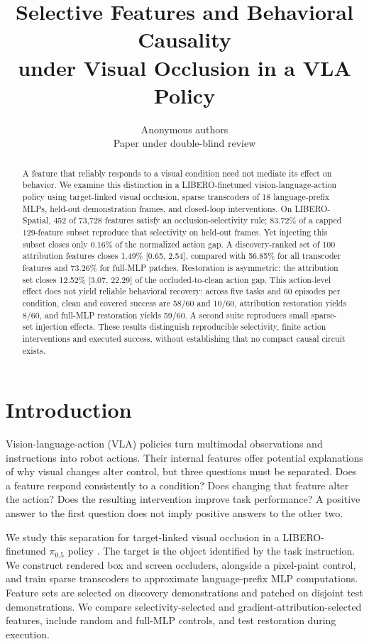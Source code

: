 \documentclass{article}
\title{Selective Features and Behavioral Causality\\under Visual Occlusion in a VLA Policy}
\author{Anonymous authors\\Paper under double-blind review}
\begin{document}
\maketitle
\begin{abstract}
A feature that reliably responds to a visual condition need not mediate its effect on behavior. We examine this distinction in a LIBERO-finetuned vision-language-action policy using target-linked visual occlusion, sparse transcoders of 18 language-prefix MLPs, held-out demonstration frames, and closed-loop interventions. On LIBERO-Spatial, 452 of 73,728 features satisfy an occlusion-selectivity rule; 83.72\% of a capped 129-feature subset reproduce that selectivity on held-out frames. Yet injecting this subset closes only 0.16\% of the normalized action gap. A discovery-ranked set of 100 attribution features closes 1.49\% [0.65, 2.54], compared with 56.85\% for all transcoder features and 73.26\% for full-MLP patches. Restoration is asymmetric: the attribution set closes 12.52\% [3.07, 22.29] of the occluded-to-clean action gap. This action-level effect does not yield reliable behavioral recovery: across five tasks and 60 episodes per condition, clean and covered success are 58/60 and 10/60, attribution restoration yields 8/60, and full-MLP restoration yields 59/60. A second suite reproduces small sparse-set injection effects. These results distinguish reproducible selectivity, finite action interventions and executed success, without establishing that no compact causal circuit exists.
\end{abstract}

\section{Introduction}
Vision-language-action (VLA) policies turn multimodal observations and instructions into robot actions. Their internal features offer potential explanations of why visual changes alter control, but three questions must be separated. Does a feature respond consistently to a condition? Does changing that feature alter the action? Does the resulting intervention improve task performance? A positive answer to the first question does not imply positive answers to the other two.

We study this separation for target-linked visual occlusion in a LIBERO-finetuned $\pi_{0.5}$ policy \citep{pi2025pi05,liu2023libero}. The target is the object identified by the task instruction. We construct rendered box and screen occluders, alongside a pixel-paint control, and train sparse transcoders to approximate language-prefix MLP computations. Feature sets are selected on discovery demonstrations and patched on disjoint test demonstrations. We compare selectivity-selected and gradient-attribution-selected features, include random and full-MLP controls, and test restoration during execution.
\end{document}

